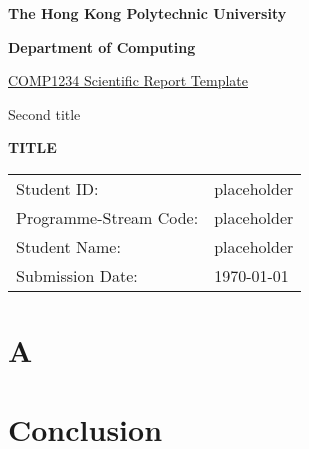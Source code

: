 \documentclass[11pt,a4paper]{article}
\makeatletter
\renewenvironment{abstract}{%
    \if@twocolumn
      \section*{\abstractname}%
    \else %
      \begin{center}%
        {\bfseries \Large\abstractname\vspace{\z@}}%
      \end{center}%
      \quotation
    \fi}
    {\if@twocolumn\else\endquotation\fi}
\makeatother
\begin{document}
\begin{center}
    \Large{\textbf{The Hong Kong Polytechnic University}}

    \Large{\textbf{Department of Computing}}
    \vspace{1cm}
    
    \underline{COMP1234 Scientific Report Template}
    
    Second title
    
    \vspace{4cm}
    
    \Huge{\textbf{TITLE}}
    
    \vspace*{\fill}
    \begin{tabular}{ll}
    \large{Student ID:}& \large{placeholder} \\
    \large{Programme-Stream Code:}& \large{placeholder} \\
    \large{Student Name:}& \large{placeholder} \\
    \large{Submission Date:}& \large{\today} \\
    \end{tabular}
\end{center}
\thispagestyle{empty}
\newpage

\tableofcontents
\thispagestyle{empty}
\newpage

\setcounter{page}{1}
\begin{abstract}
{}

\end{abstract}
\section{A}

\section{Conclusion}

\clearpage
\printbibliography[
heading=bibintoc,
title={References}
]
\end{document}
